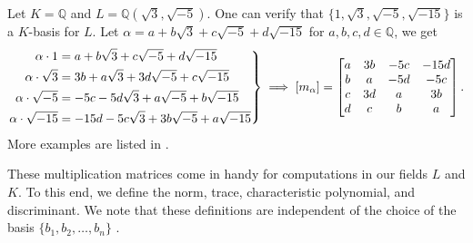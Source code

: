 \documentclass[openany, a4paper, 10pt]{book}
\theoremstyle{plain}
\theoremstyle{plain}
\theoremstyle{plain}
\theoremstyle{definition}
\theoremstyle{plain}
\theoremstyle{definition}
\theoremstyle{remark}
\newenvironment{rcases}{\left.\begin{aligned}}{\end{aligned}\right\rbrace}
\begin{document}
\begin{examplebox}[label={traces}, nameref={previous examples}]
    Let $K=\mathbb Q$ and $L = \mathbb Q(\sqrt{3}, \sqrt{-5})$.
    One can verify that $\{ 1, \sqrt{3}, \sqrt{-5}, \sqrt{-15} \}$ is a $K$-basis for $L$.
    Let $\alpha = a+b\sqrt{3}+c\sqrt{-5}+d\sqrt{-15}$ for $a,b,c,d \in \mathbb Q$, we get
    \begin{equation*}
        \begin{rcases}
            \alpha \cdot 1 &= a + b\sqrt{3} + c\sqrt{-5} + d\sqrt{-15} \\
            \alpha \cdot \sqrt{3} &= 3b + a\sqrt{3} + 3d\sqrt{-5} + c\sqrt{-15} \\
            \alpha \cdot \sqrt{-5} &= -5c - 5d\sqrt{3} + a\sqrt{-5} + b\sqrt{-15} \\
            \alpha \cdot \sqrt{-15} &= -15d - 5c\sqrt{3} + 3b\sqrt{-5} + a\sqrt{-15}
        \end{rcases}
        \implies
        [m_\alpha] =
        \begin{bmatrix}
            a & 3b & -5c & -15d \\
            b & a  & -5d & -5c \\
            c & 3d & a   & 3b \\
            d & c  & b   & a
        \end{bmatrix}.
    \end{equation*}
    \tcbline
    More examples are listed in \cite[Ex.~2.3-2.6]{Conrad_trace_norm}.
\end{examplebox}

These multiplication matrices come in handy for computations in our fields $L$ and $K$.
To this end, we define the norm, trace, characteristic polynomial, and discriminant.
We note that these definitions are independent of the choice of the basis $\{ b_1, b_2, \dots, b_n \}$ \cite[\S~4]{ANT_dictaat} \cite{lie_in_K}.
\end{document}
